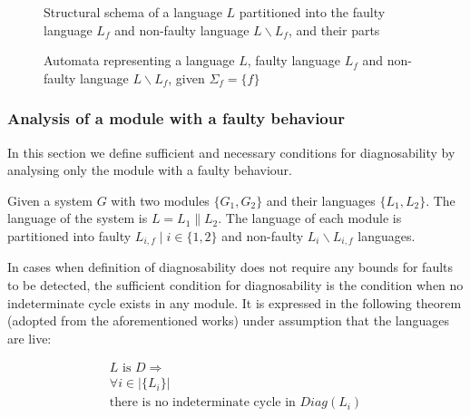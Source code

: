 \documentclass[a4paper,oneside]{article}
\begin{document}
\begin{figure}[t]
\centering

\caption{Structural schema of a language $L$ partitioned into the faulty
language $L_f$ and non-faulty language $L \backslash L_f$, and their parts
}
\label{fig_partitioning_faulty}
\end{figure}

\begin{figure}[t]
\centering

\caption{Automata representing a language $L$, faulty language $L_f$ and
non-faulty language $L \backslash L_f$, given $\Sigma_f = \{f\}$}
\label{fig_automaton_F-NF}
\end{figure}

\subsubsection{Analysis of a module with a faulty behaviour}
In this section we define sufficient and necessary conditions for diagnosability
by analysing only the module with a faulty behaviour.

Given a system $G$ with two modules $\{G_1, G_2\}$ and
their languages $\{L_1, L_2\}$. The language of the system is $L = L_1 \parallel
L_2$. 
The language of each module is partitioned into faulty $L_{i,f}\mid i\in
\{1,2\}$ and non-faulty $L_i\backslash L_{i,f}$ languages.

In cases when definition of diagnosability does not require any bounds for
faults to be detected, the sufficient condition for diagnosability is the
condition when no indeterminate cycle exists in any module. 
It is expressed in the following theorem (adopted from the aforementioned works)
under assumption that the languages are live:
\begin{theorem}
\label{trm_sufficient_for_diag}
\begin{equation}
\begin{array}{l}
	L \textrm{ is }D \Rightarrow 
	\\[1ex]
	\forall i \in |\{L_i\}|
	\\[1ex]
	\textrm{there is no indeterminate cycle in } Diag(L_i)
\end{array}
\end{equation}
\end{theorem}
\end{document}
